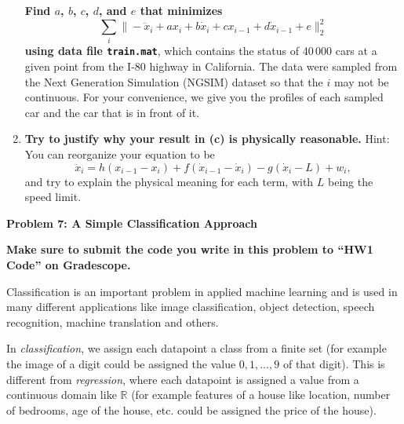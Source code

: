 \documentclass{article}\usepackage[utf8]{inputenc}\usepackage[margin=0.4cm,top=0.4cm,bottom=0.4cm]{geometry}\usepackage[usenames,dvipsnames,svgnames,table]{xcolor}
\begin{document}
\begin{enumerate}
\textbf{Find $a$, $b$, $c$, $d$, and $e$ that minimizes $$\sum_i \| -\ddot{x}_i + a x_{i} + b \dot{x}_{i} + c x_{i-1} + d \dot{x}_{i-1} + e\|_2^2$$ using data file \texttt{train.mat}}, which contains the status of 40\,000 cars at a given point from the I-80 highway in California. The data were sampled from the Next Generation Simulation (NGSIM) dataset so that the $i$ may not be continuous.  For your convenience, we give you the profiles of each sampled car and the car that is in front of it.
\BeginSolution

\EndSolution
\item \textbf{Try to justify why your result in (c) is physically reasonable.}  Hint: You can reorganize your equation to be $$\ddot{x}_i = h (x_{i-1}- x_{i}) + f (\dot{x}_{i-1} - \dot{x}_{i}) - g (\dot{x}_{i}-L)+ w_i,$$ and try to explain the physical meaning for each term, with $L$ being the speed limit.
\BeginSolution

\EndSolution
\end{enumerate}
\clearpage

\vspace{-2mm}\noindent\begin{mybox}{\begin{center}\textbf{\color{black}Problem 7: A Simple Classification Approach}\end{center}}\end{mybox}\vspace{-2mm}
\vspace{10pt}
\noindent \textbf{Make sure to submit the code you write in this problem to ``HW1 Code'' on Gradescope.}
\vspace{3pt}

\noindent Classification is an important problem in applied machine learning and is used in many different applications like image classification, object detection, speech recognition, machine translation and others.
\vspace{3pt}

\noindent In \textit{classification}, we assign each datapoint a class from a finite set (for example the image of a digit could be assigned the value $0, 1, \ldots, 9$ of that digit). This is different from \textit{regression}, where each datapoint is assigned a value from a continuous domain like $\mathbb{R}$ (for example features of a house like location, number of bedrooms, age of the house, etc. could be assigned the price of the house).
\vspace{3pt}
\end{document}
